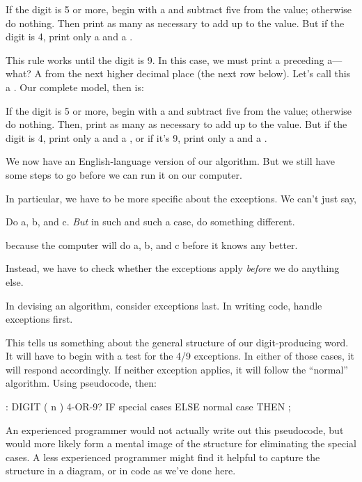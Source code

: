 \begin{tfquot}
If the digit is 5 or more, begin with a  and subtract five
from the value; otherwise do nothing. Then print as many  as
necessary to add up to the value. But if the digit is 4, print only a
 and a .
\end{tfquot}
This rule works until the digit is 9. In this case, we must print a
 preceding a---what? A  from the next higher
decimal place (the next row below). Let's call this a . Our
complete model, then is:

\begin{tfquot}
If the digit is 5 or more, begin with a  and subtract five
from the value; otherwise do nothing. Then, print as many  as
necessary to add up to the value. But if the digit is 4, print only a
 and a , or if it's 9, print only a 
and a .
\end{tfquot}
%
We now have an English-language version of our algorithm.  But we still
have some steps to go before we can run it on our computer.

In particular, we have to be more specific about the exceptions. We
can't just say,

\begin{tfquot}
Do a, b, and c. \emph{But} in such and such a case, do something different.
\end{tfquot}
because the computer will do a, b, and c before it knows any better.
\medbreak

Instead, we have to check whether the exceptions apply \emph{before} we
do anything else.

\begin{tip}
In devising an algorithm, consider exceptions last. In writing code, handle
exceptions first.
\end{tip}
This tells us something about the general structure of our digit-producing
word. It will have to begin with a test for the 4/9 exceptions. In
either of those cases, it will respond accordingly. If neither exception
applies, it will follow the ``normal'' algorithm. Using pseudocode, then:

\begin{Code}
: DIGIT  ( n )  4-OR-9? IF  special cases
   ELSE  normal case  THEN ;
\end{Code}
An experienced \Forth{} programmer would not actually write out this
pseudocode, but would more likely form a mental image of the structure
for eliminating the special cases. A less experienced programmer might
find it helpful to capture the structure in a diagram, or in code as we've
done here.

